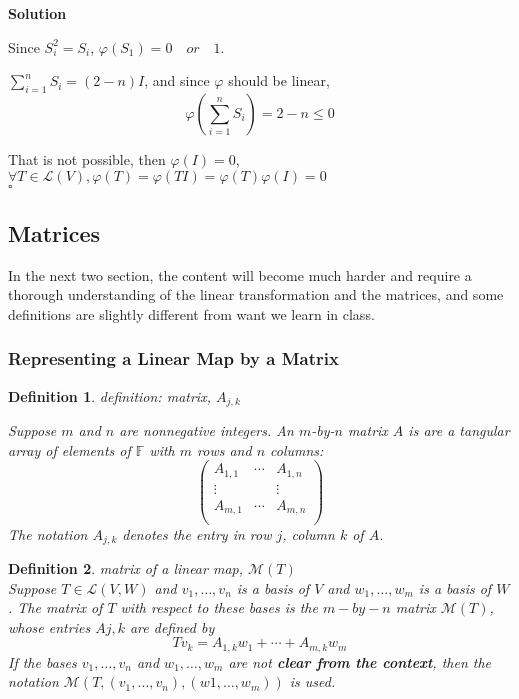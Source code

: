 \documentclass{article}
\newtheorem{definition}{Definition}[subsection]
\newenvironment{solution}{%
{
    \textbf{Solution\\}
    }
}{
  \hfill $\square$ 
  \par\bigskip 
}
\newcommand{\FF}{\mathbb{F}}
\begin{document}
\begin{CJK}{UTF8}{gkai}
\begin{solution}
Since $S_i^2 = S_i$, $\varphi(S_1) = 0\quad or\quad 1$.

$\sum_{i = 1}^n S_i= (2 - n)I$, and since $\varphi$ should be linear,
\[\varphi(\sum_{i = 1}^n S_i) = 2- n \leq 0\]

That is not possible, then $\varphi(I) = 0$,$\forall T \in \mathcal{L}(V) , \varphi(T) = \varphi(TI) = \varphi(T) \varphi(I) = 0$\\
\end{solution}

\subsection{Matrices}
In the next two section, the content will become much harder and require a thorough understanding of the linear transformation and the matrices, and some definitions are slightly different from want we learn in class.\\

\subsubsection{Representing a Linear Map by a Matrix}

\begin{definition}
    definition: matrix, $A_{j,k}$

    Suppose $m$ and $n$ are nonnegative integers. An $m$-by-$n$ matrix $A$ is are a tangular array of elements of $\FF$ with $m$ rows and $n$ columns:
    \[\begin{pmatrix}
        A_{1,1}&\cdots&A_{1,n}\\
        \vdots&&\vdots\\
        A_{m,1}&\cdots&A_{m,n}\\
    \end{pmatrix}\]
    The notation $A_{j,k}$ denotes the entry in row $j$, column $k$ of $A$.
\end{definition}

\begin{definition}matrix of a linear map, $\mathcal{M}(T)$\\
    
    Suppose $T \in \mathcal{L}(V,W)$ and $v_1,\ldots,v_n$ is a basis of $V$ and $w_1,\ldots,w_m$ is a basis of $W$. The matrix of $T$ with respect to these bases is the $m-by-n$ matrix $\mathcal{M}(T)$, whose entries $A{j,k}$ are defined by
    \[Tv_k = A_{1,k}w_1 +\cdots+A_{m,k}w_m\]
    If the bases $v_1,\ldots,v_n$ and $w_1,\ldots,w_m$ are not \textbf{clear from the context}, then the notation $\mathcal{M}(T,(v_1,\ldots,v_n),(w1,\ldots,w_m))$ is used.
 

\end{definition}
\end{CJK}
\end{document}

